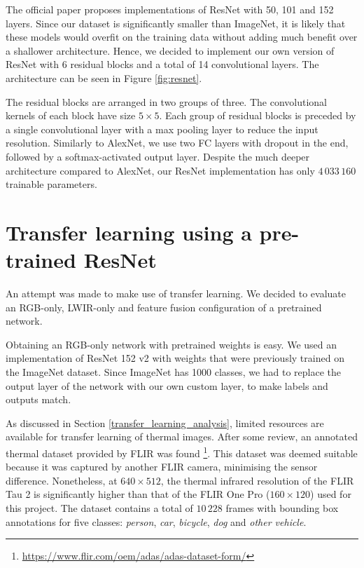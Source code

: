 \documentclass{l4proj}
\begin{document}
The official paper proposes implementations of ResNet with 50, 101 and 152 layers. Since our dataset is significantly smaller than ImageNet, it is likely that these models would overfit on the training data without adding much benefit over a shallower architecture. Hence, we decided to implement our own version of ResNet with 6 residual blocks and a total of 14 convolutional layers. The architecture can be seen in Figure \ref{fig:resnet}.

The residual blocks are arranged in two groups of three. The convolutional kernels of each block have size $5 \times 5$. Each group of residual blocks is preceded by a single convolutional layer with a max pooling layer to reduce the input resolution. Similarly to AlexNet, we use two FC layers with dropout in the end, followed by a softmax-activated output layer. Despite the much deeper architecture compared to AlexNet, our ResNet implementation has only $4\,033\,160$ trainable parameters.



\section{Transfer learning using a pre-trained ResNet}
\label{transfer_learning}

An attempt was made to make use of transfer learning. We decided to evaluate an RGB-only, LWIR-only and feature fusion configuration of a pretrained network. 

Obtaining an RGB-only network with pretrained weights is easy. We used an implementation of ResNet 152 v2 \citep{he_identity_2016} with weights that were previously trained on the ImageNet dataset. Since ImageNet has 1000 classes, we had to replace the output layer of the network with our own custom layer, to make labels and outputs match.

As discussed in Section \ref{transfer_learning_analysis}, limited resources are available for transfer learning of thermal images. After some review, an annotated thermal dataset provided by FLIR was found \footnote{\url{https://www.flir.com/oem/adas/adas-dataset-form/}}. This dataset was deemed suitable because it was captured by another FLIR camera, minimising the sensor difference. Nonetheless, at $640 \times 512$, the thermal infrared resolution of the FLIR Tau 2 is significantly higher than that of the FLIR One Pro ($160 \times 120$) used for this project. The dataset contains a total of $10\,228$ frames with bounding box annotations for five classes: \textit{person}, \textit{car}, \textit{bicycle}, \textit{dog} and \textit{other vehicle}.
\end{document}
